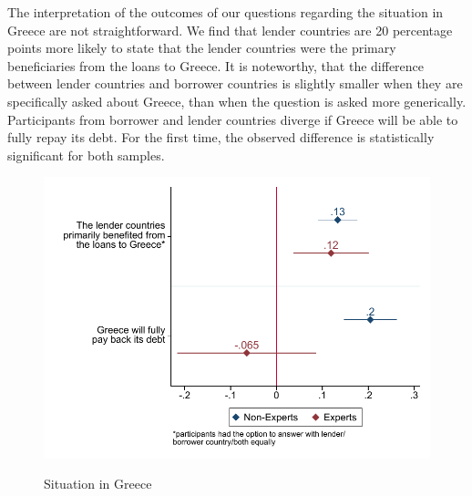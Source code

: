  \clearpage
 The interpretation of the outcomes of our questions regarding the situation in Greece are not straightforward. We find that lender countries are 20 percentage points more likely to state that the lender countries were the primary beneficiaries from the loans to Greece. It is noteworthy, that the difference between lender countries and borrower countries is slightly smaller when they are specifically asked about Greece, than when the question is asked more generically. Participants from borrower and lender countries diverge if Greece will be able to fully repay its debt. For the first time, the observed difference is statistically significant for both samples. 
 \\
\begin{figure}[h!] 
\begin{center}
     \caption{Situation in Greece}
     \includegraphics[scale=0.8]{Question6_7_base.pdf}
     \label{fig:my_label}
     \end{center}
     \tiny
\end{figure}
\clearpage
